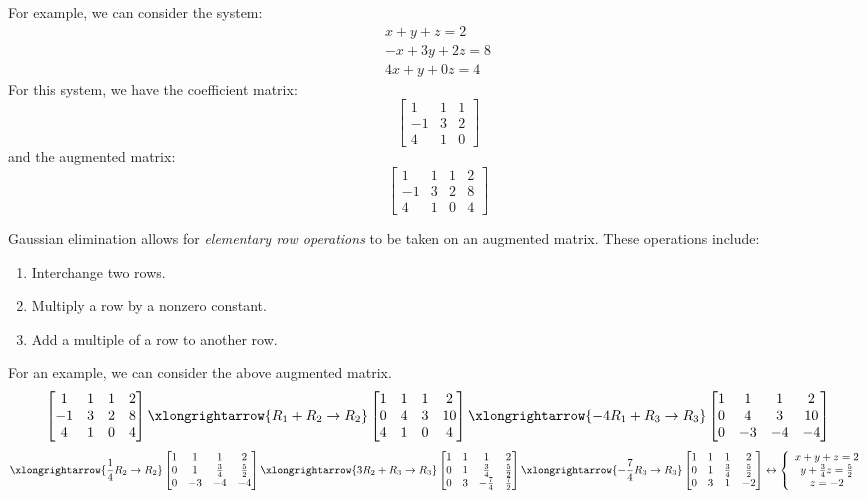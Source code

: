 For example, we can consider the system:
$$\begin{array}{c}
	x+y+z=2\\
	-x+3y+2z=8\\
	4x+y+0z=4
\end{array}$$
For this system, we have the coefficient matrix:
$$\begin{bmatrix}
	1&1&1\\-1&3&2\\4&1&0
\end{bmatrix}$$
and the augmented matrix:
$$\begin{bmatrix}
	1&1&1&2\\-1&3&2&8\\4&1&0&4
\end{bmatrix}$$
\begin{theorem}\label{thm:1}
	Gaussian elimination allows for \emph{elementary row operations} to be taken on an augmented matrix. These operations include:
	\begin{enumerate}
		\item Interchange two rows.
		\item Multiply a row by a nonzero constant.
		\item Add a multiple of a row to another row.
	\end{enumerate}
\end{theorem}
For an example, we can consider the above augmented matrix.
$$\begin{bmatrix}1&1&1&2\\-1&3&2&8\\4&1&0&4\end{bmatrix}\xlongrightarrow{R_1+R_2\rightarrow R_2}\begin{bmatrix}1&1&1&2\\0&4&3&10\\4&1&0&4\end{bmatrix}\xlongrightarrow{-4R_1+R_3\rightarrow R_3}\begin{bmatrix}1&1&1&2\\0&4&3&10\\0&-3&-4&-4\end{bmatrix}$$
$$\xlongrightarrow{\frac{1}{4}R_2\rightarrow R_2}\begin{bmatrix}1&1&1&2\\0&1&\frac{3}{4}&\frac{5}{2}\\0&-3&-4&-4\end{bmatrix}\xlongrightarrow{3R_2+R_3\rightarrow R_3}\begin{bmatrix}1&1&1&2\\0&1&\frac{3}{4}&\frac{5}{2}\\0&3&-\frac{7}{4}&\frac{7}{2}\end{bmatrix}\xlongrightarrow{-\frac{7}{4}R_3\rightarrow R_3}\begin{bmatrix}1&1&1&2\\0&1&\frac{3}{4}&\frac{5}{2}\\0&3&1&-2\end{bmatrix}\leftrightarrow\left\{
\begin{array}{c}
	x+y+z=2\\
	y+\frac{3}{4}z=\frac{5}{2}\\
	z=-2
\end{array}
\right.$$
